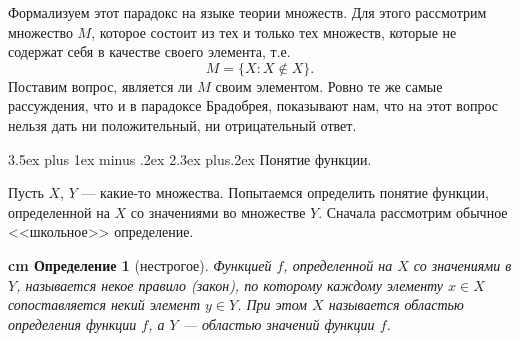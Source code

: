 \documentclass[12pt, russian]{article}
\makeatletter
\renewcommand\subsection{\@startsection {subsection}{2}{\parindent}%
{3.5ex plus 1ex minus .2ex}%
{2.3ex plus.2ex}%
{\normalfont\large\bfseries}}
\newtheorem{definition}{\hskip 0.5 cm Определение}%
\makeatother
\begin{document}
Формализуем этот парадокс на языке теории множеств. Для этого рассмотрим множество $M$, которое состоит из тех и только тех множеств, которые не содержат себя в качестве своего элемента, т.е.
\begin{equation}\label{eqRusselParadox}
	M = \{ X: X \notin X\}.
\end{equation}
Поставим вопрос, является ли $M$ своим элементом. Ровно те же самые рассуждения, что и в парадоксе Брадобрея, показывают нам, что на этот вопрос нельзя дать ни положительный, ни отрицательный ответ.


\subsection{Понятие функции.}

Пусть $X$, $Y$ --- какие-то множества. Попытаемся определить понятие функции, определенной на $X$ со значениями во множестве $Y$. Сначала рассмотрим обычное <<школьное>> определение.

\begin{definition}[нестрогое]
	Функцией $f$, определенной на $X$ со значениями в $Y$, называется некое \textit{правило} (закон), по которому каждому элементу $x \in X$ сопоставляется некий элемент $y \in Y$. При этом $X$ называется областью определения функции $f$, а $Y$ --- областью значений функции $f$.
\end{definition}




\newpage
\begin{thebibliography}{99}


\end{thebibliography}

\end{document}
